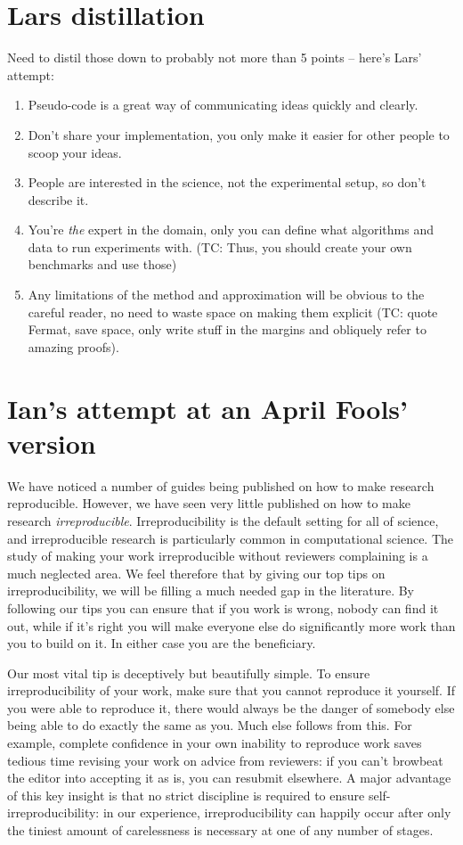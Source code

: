 \documentclass[a4paper,11pt]{article}
\begin{document}
\section{Lars distillation}
Need to distil those down to probably not more than 5 points -- here's Lars'
attempt:
\begin{enumerate}
\item Pseudo-code is a great way of communicating ideas quickly and clearly.
\item Don't share your implementation, you only make it easier for other people
to scoop your ideas.
\item People are interested in the science, not the experimental setup, so don't
describe it.
\item You're \emph{the} expert in the domain, only you can define what
algorithms and data to run experiments with. (TC: Thus, you should
create your own benchmarks and use those)
\item Any limitations of the method and approximation will be obvious to the
careful reader, no need to waste space on making them explicit (TC:
quote Fermat, save space, only write stuff in the margins and obliquely
refer to amazing proofs).
\end{enumerate}

\section{Ian's attempt at an April Fools' version}

We have noticed a number of guides being published on how to make research reproducible. However, we have seen very little published on how to make research \emph{irreproducible}.  Irreproducibility is the default setting for all of science, and irreproducible research is particularly common in computational science.  The study of making your work irreproducible without reviewers complaining is a much neglected area. We feel therefore that by giving our top tips on irreproducibility, we will be filling a much needed gap in the literature.
By following our tips you can ensure that if you work is wrong, nobody can find it out, while if it's right you will make everyone else do significantly more work than you to build on it. In either case you are the beneficiary.

Our most vital tip is deceptively but beautifully simple. To ensure irreproducibility of your work, make sure that you cannot reproduce it yourself. If you were able to reproduce it, there would always be the danger of somebody else being able to do exactly the same as you. Much else follows from this. For example, complete confidence in your own inability to reproduce work saves tedious time revising your work on advice from reviewers: if you can't browbeat the editor into accepting it as is, you can resubmit elsewhere. A major advantage of this key insight is that no strict discipline is required to ensure self-irreproducibility: in our experience, irreproducibility can happily occur after only the tiniest amount of carelessness is necessary at one of any number of stages.
\end{document}
